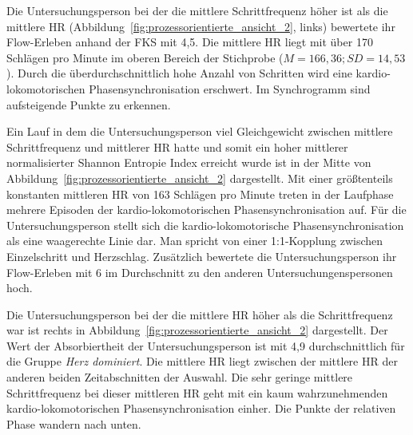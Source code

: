 Die Untersuchungsperson bei der die mittlere Schrittfrequenz höher ist als die mittlere \ac{HR} (Abbildung~\ref{fig:prozessorientierte_ansicht_2}, links) bewertete ihr Flow-Erleben anhand der \ac{FKS} mit 4,5. Die mittlere \ac{HR} liegt mit über 170 Schlägen pro Minute im oberen Bereich der Stichprobe ($M = 166{,}36; SD = 14{,}53$). Durch die überdurchschnittlich hohe Anzahl von Schritten wird eine kardio-lokomotorischen Phasensynchronisation erschwert. Im Synchrogramm sind aufsteigende Punkte zu erkennen.

\begin{sidewaysfigure}
	
	\caption[Beispielhafte Prozessdarstellung von mehreren Untersuchungspersonen.]{Beispielhafte Prozessdarstellung: Eine Minute Daten einer Untersuchungsperson der Gruppe Schritt dominiert (links), einer Untersuchungsperson Geleichgewicht (mitte) und einer Untersuchungsperson der Gruppe Herz dominert (rechts). \emph{Anmerkung}: Rel. Phase = Relative Phase.}
	\label{fig:prozessorientierte_ansicht_2}
\end{sidewaysfigure}

Ein Lauf in dem die Untersuchungsperson viel Gleichgewicht zwischen mittlere Schrittfrequenz und mittlerer HR hatte und somit ein hoher mittlerer normalisierter Shannon Entropie Index erreicht wurde ist in der Mitte von Abbildung~\ref{fig:prozessorientierte_ansicht_2} dargestellt. Mit einer größtenteils konstanten mittleren \ac{HR} von 163 Schlägen pro Minute treten in der Laufphase mehrere Episoden der kardio-lokomotorischen Phasensynchronisation auf. Für die Untersuchungsperson stellt sich die kardio-lokomotorische Phasensynchronisation als eine waagerechte Linie dar. Man spricht von einer 1:1-Kopplung zwischen Einzelschritt und Herzschlag. Zusätzlich bewertete die Untersuchungsperson ihr Flow-Erleben mit 6 im Durchschnitt zu den anderen Untersuchungenspersonen hoch. 

Die Untersuchungsperson bei der die mittlere \ac{HR} höher als die Schrittfrequenz war ist rechts in Abbildung~\ref{fig:prozessorientierte_ansicht_2} dargestellt. Der Wert der Absorbiertheit der Untersuchungsperson ist mit 4,9 durchschnittlich für die Gruppe \emph{Herz dominiert}. Die mittlere \ac{HR} liegt zwischen der mittlere \ac{HR} der anderen beiden Zeitabschnitten der Auswahl. Die sehr geringe mittlere Schrittfrequenz bei dieser mittleren \ac{HR} geht mit ein kaum wahrzunehmenden kardio-lokomotorischen Phasensynchronisation einher. Die Punkte der relativen Phase wandern nach unten. 

